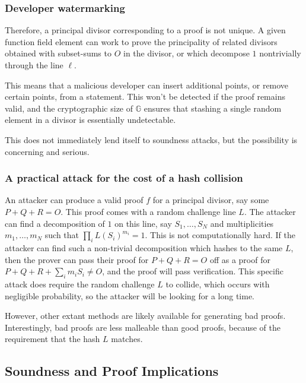 \documentclass{article}
\theoremstyle{definition}
\newcommand{\6}{\mathbf}
\newcommand{\7}{\mathcal}
\begin{document}

\subsubsection{Developer watermarking}

Therefore, a principal divisor corresponding to a proof is not unique. A given function field element can work to prove the principality of related divisors obtained with subset-sums to $O$ in the divisor, or which decompose $1$ nontrivially through the line $\ell$.

This means that a malicious developer can insert additional points, or remove certain points, from a statement. This won't be detected if the proof remains valid, and the cryptographic size of $\mathbb{G}$ ensures that stashing a single random element in a divisor is essentially undetectable. 

This does not immediately lend itself to soundness attacks, but the possibility is concerning and serious.


\subsubsection{A practical attack for the cost of a hash collision}

An attacker can produce a valid proof $f$ for a principal divisor, say some $P + Q + R = O$. This proof comes with a random challenge line $L$. The attacker can find a decomposition of $1$ on this line, say $S_1, \ldots, S_N$ and multiplicities $m_1, \ldots, m_N$ such that $\prod_i L(S_i)^{m_i} = 1$. This is not computationally hard. If the attacker can find such a non-trivial decomposition which hashes to the same $L$, then the prover can pass their proof for $P + Q + R = O$ off as a proof for $P + Q + R + \sum_i m_i S_i \neq O$, and the proof will pass verification. This specific attack does require the random challenge $L$ to collide, which occurs with negligible probability, so the attacker will be looking for a long time.

However, other extant methods are likely available for generating bad proofs. Interestingly, bad proofs are less malleable than good proofs, because of the requirement that the hash $L$ matches. 


\subsection{Soundness and Proof Implications}
\end{document}

